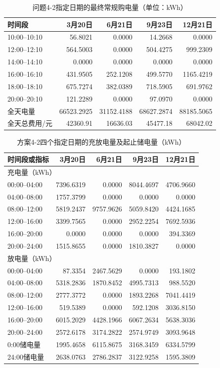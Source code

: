 \begin{table}[H]
\centering\small
\caption{问题4-2指定日期的最终常规购电量（单位：kWh）}\label{tab:q4_4-2-final}
\begin{tabular}{lrrrr}
\toprule
时间段 & 3月20日 & 6月21日 & 9月23日 & 12月21日\\
\midrule
10:00--10:10 & 56.8021 & 0.0000 & 14.2668 & 0.0000\\
12:00--12:10 & 564.5003 & 0.0000 & 504.4275 & 999.2309\\
14:00--14:10 & 0.0000 & 0.0000 & 0.0000 & 0.0000\\
16:00--16:10 & 431.9505 & 252.1208 & 499.5770 & 1165.4219\\
18:00--18:10 & 675.7274 & 382.0389 & 718.5905 & 691.9762\\
20:00--20:10 & 121.2289 & 0.0000 & 97.0970 & 0.0000\\
全天电量 & 66523.2925 & 31152.4188 & 68627.2874 & 88185.5065\\
全天总费用/元 & 42360.91 & 16636.03 & 45477.18 & 68042.02\\
\bottomrule
\end{tabular}
\end{table}
\begin{table}[H]\centering\small
\caption{方案4-2四个指定日期的充放电量及起止储电量（kWh）}\label{tab:q4_4-2-storage-dates}
\begin{tabular}{lrrrr}\toprule
时间段或指标&3月20日&6月21日&9月23日&12月21日\\\midrule
\multicolumn{5}{l}{充电量（kWh）}\\
00:00--04:00&7396.6319&0.0000&8044.4697&4706.9660\\
04:00--08:00&1757.3799&0.0000&0.0000&0.0000\\
08:00--12:00&5819.2437&9757.9626&5059.8420&4424.1685\\
12:00--16:00&3399.7565&0.0000&2952.2254&7692.5936\\
16:00--20:00&0.0000&0.0000&0.0000&394.3369\\
20:00--24:00&1515.8655&0.0000&1810.3827&0.0000\\
\midrule
\multicolumn{5}{l}{放电量（kWh）}\\
00:00--04:00&87.3354&2467.5629&0.0000&193.1802\\
04:00--08:00&5318.2836&1870.8452&4995.7313&988.5520\\
08:00--12:00&2777.3772&0.0000&1893.2268&7041.4419\\
12:00--16:00&519.5389&0.0000&592.1208&3036.8150\\
16:00--20:00&6015.2029&4428.1966&6067.2634&5638.3036\\
20:00--24:00&2572.6178&3174.2822&2574.9749&3093.9648\\
\midrule
0:00储电量&1995.4658&6115.8675&3168.3459&6334.5799\\
24:00储电量&2638.0763&2786.2837&3122.9258&1595.3809\\
\bottomrule\end{tabular}\end{table}
